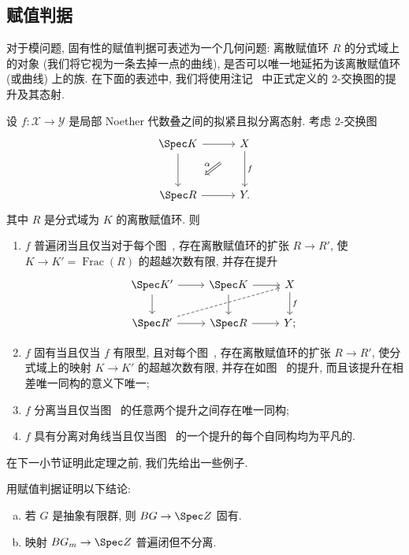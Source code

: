 \subsection{赋值判据}\label{src:4.8.2-subsection}
对于模问题, 固有性的赋值判据可表述为一个几何问题: 离散赋值环 $R$ 的分式域上的对象 (我们将它视为一条去掉一点的曲线), 是否可以唯一地延拓为该离散赋值环 (或曲线) 上的族. 在下面的表述中, 我们将使用注记~ 中正式定义的 2-交换图的提升及其态射.
\begin{theorem}\label{src:4.8.7}
设 $f:\mathcal X\to\mathcal Y$ 是局部 Noether 代数叠之间的拟紧且拟分离态射. 考虑 2-交换图
\begin{equation}\label{src:4.8.8}
\begin{tikzcd}[column sep=3em,row sep=3em]
\Spec K\arrow[r]\arrow[d]&\mathcal X\arrow[d,"f"]\\
\Spec R\arrow[r]&\mathcal Y.
\arrow[Rightarrow,from=1-2,to=2-1,shorten <=1.7em,shorten >=1.7em,"\alpha"']
\end{tikzcd}
\end{equation}
其中 $R$ 是分式域为 $K$ 的离散赋值环. 则
\begin{enumerate}[(1)]
\item $f$ 普遍闭当且仅当对于每个图~, 存在离散赋值环的扩张 $R\to R'$, 使 $K\to K'=\operatorname{Frac}(R)$ 的超越次数有限, 并存在提升
\begin{equation}\label{src:4.8.9}
\begin{tikzcd}[column sep=2.4em]
\Spec K'\arrow[r]\arrow[d]&\Spec K\arrow[r]\arrow[d]&\mathcal X\arrow[d,"f"]\\
\Spec R'\arrow[r]\arrow[urr,dashed]&\Spec R\arrow[r]&\mathcal Y;
\end{tikzcd}
\end{equation}
\item $f$ 固有当且仅当 $f$ 有限型, 且对每个图~, 存在离散赋值环的扩张 $R\to R'$, 使分式域上的映射 $K\to K'$ 的超越次数有限, 并存在如图~ 的提升, 而且该提升在相差唯一同构的意义下唯一;
\item $f$ 分离当且仅当图~ 的任意两个提升之间存在唯一同构;
\item $f$ 具有分离对角线当且仅当图~ 的一个提升的每个自同构均为平凡的.
\end{enumerate}
\end{theorem}
在下一小节证明此定理之前, 我们先给出一些例子.
\newpage
\begin{exercise}[值得练习]\label{src:4.8.10}
用赋值判据证明以下结论:
\begin{enumerate}[(a)]
\item 若 $G$ 是抽象有限群, 则 $BG\to\Spec\mathbb Z$ 固有.
\item 映射 $B\mathbb G_m\to\Spec\mathbb Z$ 普遍闭但不分离.
\end{enumerate}
\end{exercise}
